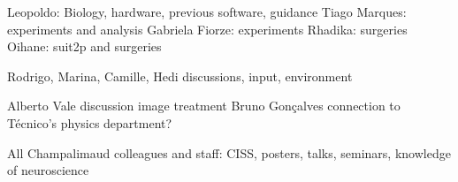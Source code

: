 
\begin{acknowledgments} 

Leopoldo: Biology, hardware, previous software, guidance
Tiago Marques: experiments and analysis
Gabriela Fiorze: experiments
Rhadika: surgeries
Oihane: suit2p and surgeries

Rodrigo, Marina, Camille, Hedi discussions, input, environment

Alberto Vale discussion image treatment
Bruno Gonçalves connection to Técnico's physics department?

All Champalimaud colleagues and staff: CISS, posters, talks, seminars, knowledge of neuroscience

\end{acknowledgments}
\clearpage
\thispagestyle{empty}
\cleardoublepage